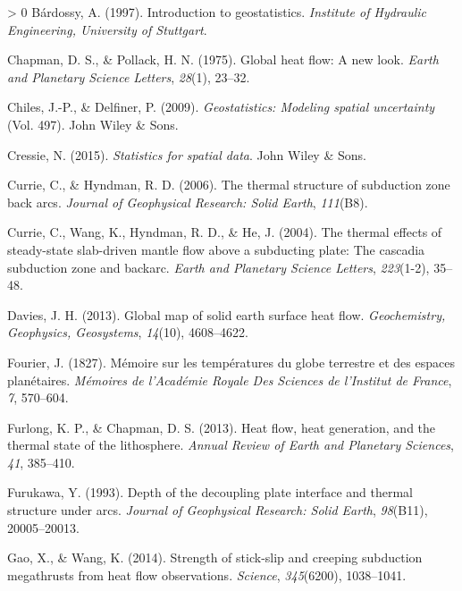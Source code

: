 \documentclass[draft,linenumbers]{agujournal2018}
\newlength{\cslhangindent}
\newenvironment{CSLReferences}[3] %
 {%
  \setlength{\parindent}{0pt}
  \ifodd #1 \everypar{\setlength{\hangindent}{\cslhangindent}}\ignorespaces\fi
  \ifnum #2 > 0
  \setlength{\parskip}{#2\baselineskip}
  \fi
 }%
 {}
\begin{document}
\hypertarget{refs}{}
\begin{CSLReferences}{1}{0}
\leavevmode\hypertarget{ref-bardossy1997}{}%
Bárdossy, A. (1997). Introduction to geostatistics. \emph{Institute of
Hydraulic Engineering, University of Stuttgart}.

\leavevmode\hypertarget{ref-chapman1975}{}%
Chapman, D. S., \& Pollack, H. N. (1975). Global heat flow: A new look.
\emph{Earth and Planetary Science Letters}, \emph{28}(1), 23--32.

\leavevmode\hypertarget{ref-chiles2009}{}%
Chiles, J.-P., \& Delfiner, P. (2009). \emph{Geostatistics: Modeling
spatial uncertainty} (Vol. 497). John Wiley \& Sons.

\leavevmode\hypertarget{ref-cressie2015}{}%
Cressie, N. (2015). \emph{Statistics for spatial data}. John Wiley \&
Sons.

\leavevmode\hypertarget{ref-currie2006}{}%
Currie, C., \& Hyndman, R. D. (2006). The thermal structure of
subduction zone back arcs. \emph{Journal of Geophysical Research: Solid
Earth}, \emph{111}(B8).

\leavevmode\hypertarget{ref-currie2004}{}%
Currie, C., Wang, K., Hyndman, R. D., \& He, J. (2004). The thermal
effects of steady-state slab-driven mantle flow above a subducting
plate: The cascadia subduction zone and backarc. \emph{Earth and
Planetary Science Letters}, \emph{223}(1-2), 35--48.

\leavevmode\hypertarget{ref-davies2013}{}%
Davies, J. H. (2013). Global map of solid earth surface heat flow.
\emph{Geochemistry, Geophysics, Geosystems}, \emph{14}(10), 4608--4622.

\leavevmode\hypertarget{ref-fourier1827}{}%
Fourier, J. (1827). M{é}moire sur les temp{é}ratures du globe terrestre
et des espaces plan{é}taires. \emph{M{é}moires de l'Acad{é}mie Royale
Des Sciences de l'Institut de France}, \emph{7}, 570--604.

\leavevmode\hypertarget{ref-furlong2013}{}%
Furlong, K. P., \& Chapman, D. S. (2013). Heat flow, heat generation,
and the thermal state of the lithosphere. \emph{Annual Review of Earth
and Planetary Sciences}, \emph{41}, 385--410.

\leavevmode\hypertarget{ref-furukawa1993}{}%
Furukawa, Y. (1993). Depth of the decoupling plate interface and thermal
structure under arcs. \emph{Journal of Geophysical Research: Solid
Earth}, \emph{98}(B11), 20005--20013.

\leavevmode\hypertarget{ref-gao2014}{}%
Gao, X., \& Wang, K. (2014). Strength of stick-slip and creeping
subduction megathrusts from heat flow observations. \emph{Science},
\emph{345}(6200), 1038--1041.


\end{CSLReferences}
\end{document}
